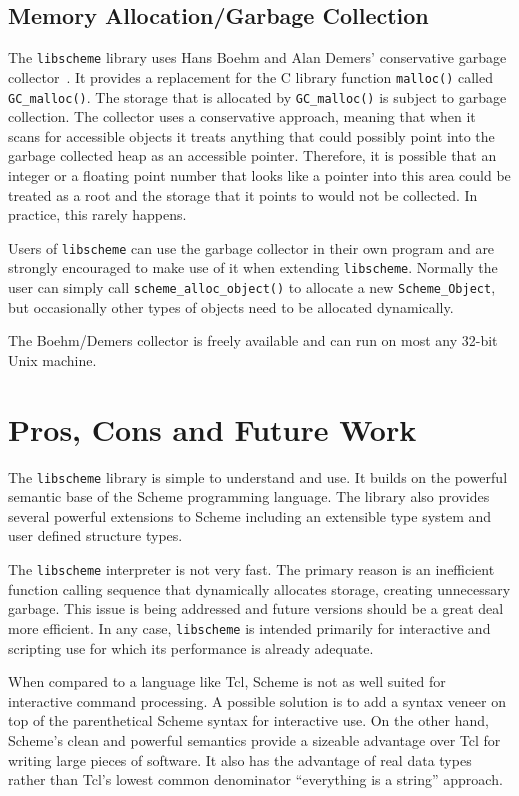 \subsection{Memory Allocation/Garbage Collection}

The \verb+libscheme+ library uses Hans Boehm and Alan Demers'
conservative garbage collector~\cite{bib:boehm}.  It provides a
replacement for the C library function \verb+malloc()+ called
\verb+GC_malloc()+.  The storage that is allocated by
\verb+GC_malloc()+ is subject to garbage collection.  The collector
uses a conservative approach, meaning that when it scans for
accessible objects it treats anything that could possibly point into
the garbage collected heap as an accessible pointer.  Therefore, it is
possible that an integer or a floating point number that looks like a
pointer into this area could be treated as a root and the storage that
it points to would not be collected.  In practice, this rarely
happens.

Users of \verb+libscheme+ can use the garbage collector in their own
program and are strongly encouraged to make use of it when extending
\verb+libscheme+.  Normally the user can simply call
\verb+scheme_alloc_object()+ to allocate a new \verb+Scheme_Object+,
but occasionally other types of objects need to be allocated
dynamically.

The Boehm/Demers collector is freely available and can run on most any
32-bit Unix machine.

\section{Pros, Cons and Future Work}

The \verb+libscheme+ library is simple to understand and use.  It
builds on the powerful semantic base of the Scheme programming
language.  The library also provides several powerful extensions to
Scheme including an extensible type system and user defined structure
types.  

The \verb+libscheme+ interpreter is not very fast.  The primary reason
is an inefficient function calling sequence that dynamically allocates
storage, creating unnecessary garbage.  This issue is being addressed
and future versions should be a great deal more efficient.  In any
case, \verb+libscheme+ is intended primarily for interactive and
scripting use for which its performance is already adequate.

When compared to a language like Tcl, Scheme is not as well suited for
interactive command processing.  A possible solution is to add a
syntax veneer on top of the parenthetical Scheme syntax for
interactive use.  On the other hand, Scheme's clean and powerful
semantics provide a sizeable advantage over Tcl for writing large
pieces of software.  It also has the advantage of real data types
rather than Tcl's lowest common denominator ``everything is a string''
approach.

